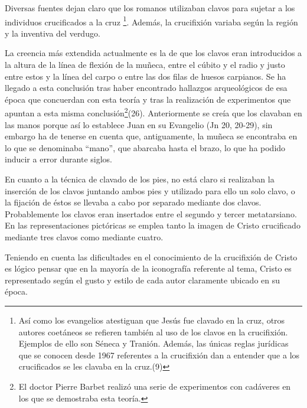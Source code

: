Diversas fuentes dejan claro que los romanos utilizaban clavos para sujetar a los individuos crucificados a la cruz \footnote{Así como los evangelios atestiguan que Jesús fue clavado en la cruz, otros autores coetáneos se refieren también al uso de los clavos en la crucifixión. Ejemplos de ello son Séneca y Tranión. Además, las únicas reglas jurídicas que se conocen desde 1967 referentes a la crucifixión dan a entender que a los crucificados se les clavaba en la cruz.(9)}. Además, la crucifixión variaba según la región y la inventiva del verdugo.

La creencia más extendida actualmente es la de que los clavos eran introducidos a la altura de la línea de flexión  de la muñeca, entre el cúbito y el radio y justo entre estos y la línea del carpo o entre las dos filas de huesos carpianos. Se ha llegado a esta conclusión tras haber encontrado hallazgos arqueológicos de esa época que concuerdan con esta teoría y tras la realización de experimentos que apuntan a esta misma conclusión\footnote{El doctor Pierre Barbet realizó una serie de experimentos con cadáveres en los que se demostraba esta teoría.}(26). Anteriormente se creía que los clavaban en las manos porque así lo establece Juan en su Evangelio (Jn 20, 20-29), sin embargo ha de tenerse en cuenta que, antiguamente, la muñeca se encontraba en lo que se denominaba ``mano'', que abarcaba hasta el brazo, lo que ha podido inducir a error durante siglos.

En cuanto a la técnica de clavado de los pies, no está claro si realizaban la inserción de los clavos juntando ambos pies y utilizado para ello un solo clavo, o la fijación de éstos se llevaba a cabo por separado mediante dos clavos. Probablemente los clavos eran insertados entre el segundo y tercer metatarsiano. En las representaciones pictóricas se emplea tanto la imagen de Cristo crucificado mediante tres clavos como mediante cuatro.

Teniendo en cuenta las dificultades en el conocimiento de la crucifixión de Cristo es lógico pensar que en la mayoría de la iconografía referente al tema, Cristo es representado según el gusto y estilo de cada autor claramente ubicado en su época.


